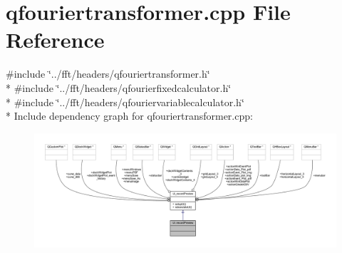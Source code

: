 \hypertarget{a00121}{\section{qfouriertransformer.\+cpp File Reference}
\label{a00121}
}
{\ttfamily \#include \char`\"{}../fft/headers/qfouriertransformer.\+h\char`\"{}}\\*
{\ttfamily \#include \char`\"{}../fft/headers/qfourierfixedcalculator.\+h\char`\"{}}\\*
{\ttfamily \#include \char`\"{}../fft/headers/qfouriervariablecalculator.\+h\char`\"{}}\\*
Include dependency graph for qfouriertransformer.\+cpp\+:
\nopagebreak
\begin{figure}[H]
\begin{center}
\leavevmode
\includegraphics[width=350pt]{dd/dbb/a00330}
\end{center}
\end{figure}
